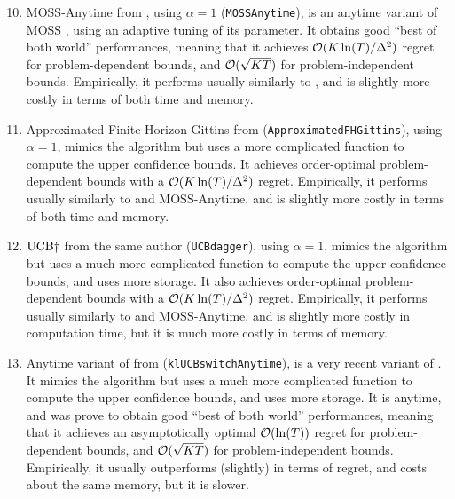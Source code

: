 \begin{enumerate}
    \setcounter{enumi}{9}
    \item
    $\mathrm{MOSS}$-$\mathrm{Anytime}$ from \cite{Degenne16}, using $\alpha=1$ (\texttt{MOSSAnytime}),
    is an anytime variant of $\mathrm{MOSS}$ \cite{BubeckSlivkins12}, using an adaptive tuning of its parameter. It obtains good ``best of both world'' performances, meaning that it achieves $\mathcal{O}(K\ln(T)/\Delta^2)$ regret for problem-dependent bounds, and $\mathcal{O}(\sqrt{KT})$ for problem-independent bounds.
    Empirically, it performs usually similarly to \UCB, and is slightly more costly in terms of both time and memory.

    \item
    Approximated Finite-Horizon Gittins from \cite{Lattimore16a} (\texttt{ApproximatedFHGittins}), using $\alpha=1$,
    mimics the \UCB{} algorithm but uses a more complicated function to compute the upper confidence bounds.
    It achieves order-optimal problem-dependent bounds with a $\mathcal{O}(K\ln(T)/\Delta^2)$ regret.
    Empirically, it performs usually similarly to \UCB{} and $\mathrm{MOSS}$-$\mathrm{Anytime}$, and is slightly more costly in terms of both time and memory.

    \item
    $\mathrm{UCB}\dagger$ from the same author \cite{Lattimore2018refining} (\texttt{UCBdagger}), using $\alpha=1$,
    mimics the \UCB{} algorithm but uses a much more complicated function to compute the upper confidence bounds, and uses more storage.
    It also achieves order-optimal problem-dependent bounds with a $\mathcal{O}(K\ln(T)/\Delta^2)$ regret.
    Empirically, it performs usually similarly to \UCB{} and $\mathrm{MOSS}$-$\mathrm{Anytime}$, and is slightly more costly in computation time, but it is much more costly in terms of memory.

    \item
    Anytime variant of \KLUCBswitch{} from \cite{GarivierHadiji2018}
    (\texttt{klUCBswitchAnytime}),
    is a very recent variant of \KLUCB{} \cite{KLUCBJournal}.
    It mimics the \KLUCB{} algorithm but uses a much more complicated function to compute the upper confidence bounds, and uses more storage.
    It is anytime, and was prove to obtain good ``best of both world'' performances, meaning that it achieves an asymptotically optimal $\mathcal{O}(\ln(T))$ regret for problem-dependent bounds, and $\mathcal{O}(\sqrt{KT})$ for problem-independent bounds.
    Empirically, it usually outperforms (slightly) \klUCB{} in terms of regret, and costs about the same memory, but it is slower.


\end{enumerate}
